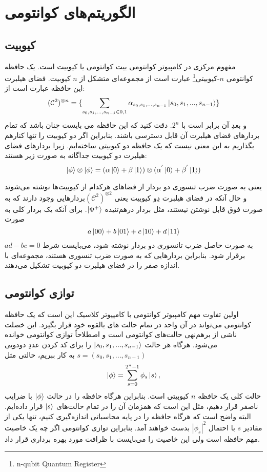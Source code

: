 \section{الگوریتم‌های کوانتومی}
\subsection{کیوبیت}
 مفهوم مرکزی در کامپیوتر کوانتومی بیت کوانتومی یا کیوبیت است. یک حافظه کوانتومی $n$-کیوبیتی\footnote{n-qubit Quantum Register} عبارت است از مجموعه‌ای متشکل از $n$ کیوبیت. فضای هیلبرت این حافظه عبارت است از: 
  \begin{equation}
  	(\mathcal{C}^{2})^{\otimes n} = \{ \sum_{s_{0},s_{1},...,s_{n-1} \in {0,1}} \alpha_{s_{0},s_{1},...,s_{n-1}} \ket{s_{0},s_{1},...,s_{n-1}} \}
  \end{equation}
  و بعدِ آن برابر است با $2^{n}$. دقت کنید که این حافظه می بایست چنان باشد که تمام بردارهای فضای هیلبرت آن قابل دسترسی باشند. بنابراین اگر دو کیوبیت را تنها کنارهم بگذاریم به این معنی نیست که یک حافظه دو کیوبیتی ساخته‌ایم. زیرا بردارهای فضای هیلبرت دو کیوبیت جداگانه به صورت زیر هستند: 
  \begin{equation}
  	\ket{\phi} \otimes \ket{\phi} = (\alpha\ket{0} + \beta\ket{1}) \otimes (\alpha^{'}\ket{0} + \beta^{'}\ket{1})
  \end{equation}
  
  یعنی به صورت ضرب تنسوری دو بردار از فضاهای هرکدام از کیوبیت‌ها نوشته می‌شوند و حال آنکه در فضای هیلبرت دِو  کیوبیت یعنی 
  $(\mathcal{C}^{2})^{\otimes 2}$بردارهایی وجود دارند که به صورت فوق قابل نوشتن نیستند، مثل بردار درهم‌تنیده  $\ket{\Phi^{+}}$. برای آنکه یک بردار کلی به صورت 
   \begin{equation}
   a\ket{00} + b\ket{01} + c\ket{10} + d\ket{11}
\end{equation}    
  به صورت حاصل ضرب تانسوری دو بردار نوشته شود، می‌بایست شرط $ad - bc = 0$ برقرار شود. بنابراین بردارهایی که به صورت ضرب تنسوری هستند، مجموعه‌ای با اندازه صفر را در فضای هیلبرت دو کیوبیت تشکیل می‌دهند.
  \subsection{توازی کوانتومی}
  اولین تفاوت مهم کامپیوتر کوانتومی با کامپیوتر کلاسیک این است که یک حافظه کوانتومی می‌تواند در آن واحد در تمام حالت های بالقوه خود قرار بگیرد. این خصلت ناشی از برهم‌نهی حالت‌های کوانتومی است و اصطلاحاً توازی کوانتومی  خوانده می‌شود. هرگاه هر حالت $\ket{s_{0},s_{1},...,s_{n-1}}$ را برای کد کردن عددِ دودویی $s = (s_{0},s_{1},...,s_{n-1})$ به کار ببریم، حالتی مثل 
  \begin{equation}
  	\ket{\phi} = \sum_{s = 0}^{2^{n} - 1} \phi_{s}\ket{s}, 
\end{equation}   
حالت کلی یک حافظه $n$ کیوبیتی است. بنابراین هرگاه حافظه را در حالت $\ket{\phi}$ با ضرایب ناصفر قرار دهیم، مثل این است که همزمان آن را در تمام حالت‌های $\ket{s}$  قرار داده‌ایم. البته واضح است که هرگاه حافظه را در پایه محاسباتی اندازه‌گیری کنیم، تنها یکی از مقادیر $s$ با احتمال $| \phi_{s} |^{2}$ بدست خواهند آمد. بنابراین توازی کوانتومی اگر چه یک خاصیت مهم حافظه است ولی این خاصیت را می‌بایست با ظرافت مورد بهره برداری قرار داد. 

